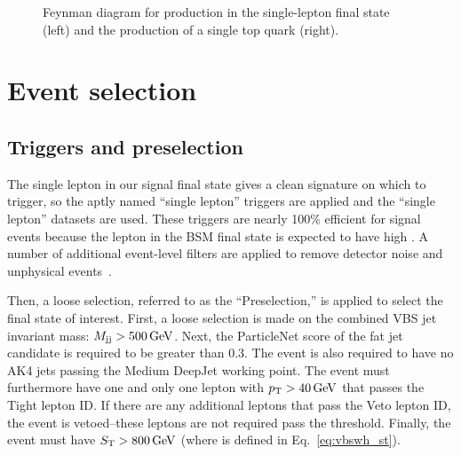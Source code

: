\begin{figure}[htb]
    \centering
    \quad             %
    \caption{
        Feynman diagram for \wjets production in the single-lepton final state (left) and the production of a single top quark (right). 
    }
    \label{fig:vbswh_subl_bkg} %
\end{figure}

\section{Event selection}
\subsection{Triggers and preselection}
The single lepton in our signal final state gives a clean signature on which to trigger, so the aptly named ``single lepton'' triggers are applied and the ``single lepton'' datasets are used. 
These triggers are nearly 100\% efficient for signal events because the lepton in the BSM final state is expected to have high \pt. 
A number of additional event-level filters are applied to remove detector noise and unphysical events~\cite{JMEPaper}. 

Then, a loose selection, referred to as the ``Preselection,'' is applied to select the final state of interest. 
First, a loose selection is made on the combined VBS jet invariant mass: $M_{\mathrm{j}\mathrm{j}} > 500\,\text{Ge\hspace{-.08em}V}$.
Next, the ParticleNet \Xtobb score of the \Htobb fat jet candidate is required to be greater than 0.3.
The event is also required to have no AK4 jets passing the Medium DeepJet working point.
The event must furthermore have one and only one lepton with $p_{\mathrm{T}} > 40\,\text{Ge\hspace{-.08em}V}$ that passes the Tight lepton ID. 
If there are any additional leptons that pass the Veto lepton ID, the event is vetoed--these leptons are not required pass the \pt threshold. 
Finally, the event must have $S_{\mathrm{T}} > 800\,\text{Ge\hspace{-.08em}V}$ (where \ST is defined in Eq.~\ref{eq:vbswh_st}).

